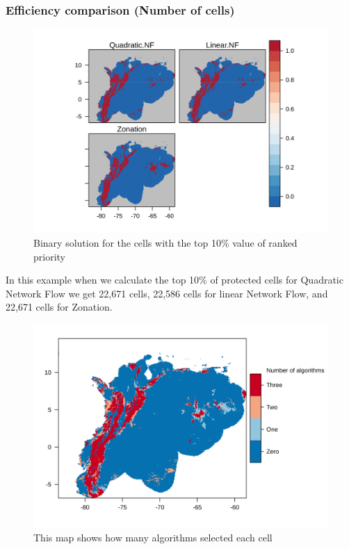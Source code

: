 \documentclass[]{article}
\begin{document}
\hypertarget{efficiency-comparison-number-of-cells}{%
\subsubsection{Efficiency comparison (Number of cells)}\label{efficiency-comparison-number-of-cells}}

\begin{figure}
\centering
\includegraphics{NFPaper_files/figure-latex/Binary-1.png}
\caption{\label{fig:Binary}Binary solution for the cells with the top 10\% value of ranked priority}
\end{figure}

In this example when we calculate the top 10\% of protected cells for Quadratic Network Flow we get 22,671 cells, 22,586 cells for linear Network Flow, and 22,671 cells for Zonation.

\begin{figure}
\centering
\includegraphics{NFPaper_files/figure-latex/NumberOfTimes-1.png}
\caption{\label{fig:NumberOfTimes}This map shows how many algorithms selected each cell}
\end{figure}
\end{document}
